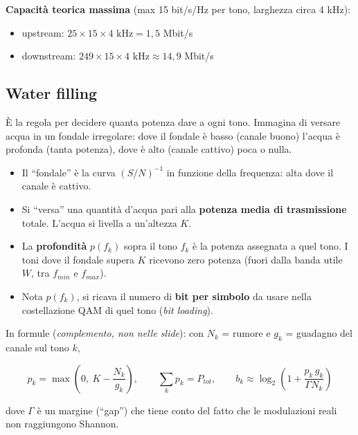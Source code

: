 \textbf{Capacità teorica massima} (max 15 bit/s/Hz per tono, larghezza circa 4 kHz):

\begin{itemize}
\tightlist
\item
  upstream: \(25 \times 15 \times 4 \text{ kHz} = 1{,}5\) Mbit/s
\item
  downstream: \(249 \times 15 \times 4 \text{ kHz} \approx 14{,}9\) Mbit/s
\end{itemize}

\subsection{Water filling}

\begin{inbreve}

È la regola per decidere quanta potenza dare a ogni tono. Immagina di versare acqua in un fondale irregolare: dove il fondale è basso (canale buono) l'acqua è profonda (tanta potenza), dove è alto (canale cattivo) poca o nulla.

\end{inbreve}

\begin{itemize}
\tightlist
\item
  Il ``fondale'' è la curva \((S/N)^{-1}\) in funzione della frequenza: alta dove il canale è cattivo.
\item
  Si ``versa'' una quantità d'acqua pari alla \textbf{potenza media di trasmissione} totale. L'acqua si livella a un'altezza \(K\).
\item
  La \textbf{profondità} \(p(f_k)\) sopra il tono \(f_k\) è la potenza assegnata a quel tono. I toni dove il fondale supera \(K\) ricevono zero potenza (fuori dalla banda utile \(W\), tra \(f_{min}\) e \(f_{max}\)).
\item
  Nota \(p(f_k)\), si ricava il numero di \textbf{bit per simbolo} da usare nella costellazione QAM di quel tono (\emph{bit loading}).
\end{itemize}

In formule (\emph{complemento, non nelle slide}): con \(N_k\) = rumore e \(g_k\) = guadagno del canale sul tono \(k\),

\[
p_k = \max\left(0,\ K - \frac{N_k}{g_k}\right), \qquad \sum_k p_k = P_{tot}, \qquad b_k \approx \log_2\left(1 + \frac{p_k\, g_k}{\Gamma N_k}\right)
\]

dove \(\Gamma\) è un margine (``gap'') che tiene conto del fatto che le modulazioni reali non raggiungono Shannon.

